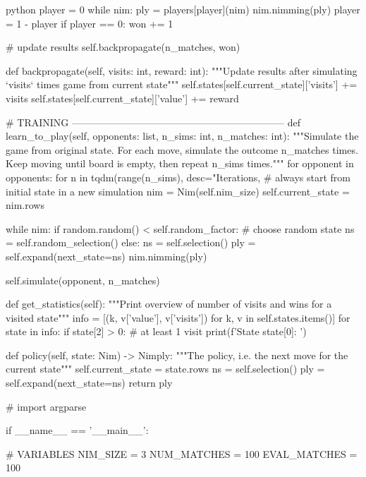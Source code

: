 \begin{mintedbox}{python}
            player = 0
            while nim:
                ply = players[player](nim)
                nim.nimming(ply)
                player = 1 - player
            if player == 0:
                won += 1

        # update results
        self.backpropagate(n_matches, won)

    def backpropagate(self, visits: int, reward: int):
        """Update results after simulating `visits` times game from current state"""
        self.states[self.current_state]['visits'] += visits
        self.states[self.current_state]['value'] += reward

    # TRAINING -----------------------------------------------------------------
    def learn_to_play(self, opponents: list, n_sims: int, n_matches: int):
        """Simulate the game from original state. For each move, simulate the outcome n_matches times.
        Keep moving until board is empty, then repeat n_sims times."""
        for opponent in opponents:
            for n in tqdm(range(n_sims), desc="Iterations, %
                # always start from initial state in a new simulation
                nim = Nim(self.nim_size)
                self.current_state = nim.rows

                while nim:
                    if random.random() < self.random_factor:
                        # choose random state
                        ns = self.random_selection()
                    else:
                        ns = self.selection()
                    ply = self.expand(next_state=ns)
                    nim.nimming(ply)

                    self.simulate(opponent, n_matches)

    def get_statistics(self):
        """Print overview of number of visits and wins for a visited state"""
        info = [(k, v['value'], v['visits']) for k, v in self.states.items()]
        for state in info:
            if state[2] > 0:  # at least 1 visit
                print(f'State {state[0]}:  ')

    def policy(self, state: Nim) -> Nimply:
        """The policy, i.e. the next move for the current state"""
        self.current_state = state.rows
        ns = self.selection()
        ply = self.expand(next_state=ns)
        return ply

# %
import argparse

if __name__ == '__main__':

    # VARIABLES
    NIM_SIZE = 3
    NUM_MATCHES = 100
    EVAL_MATCHES = 100


\end{mintedbox}
